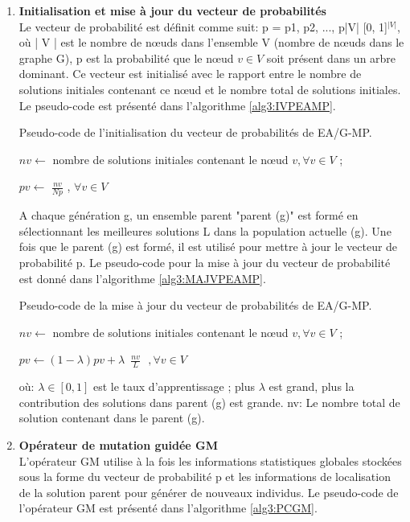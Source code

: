 \begin{enumerate}[label=\alph*)]
	\item \textbf{Initialisation et mise à jour du vecteur de probabilités}\\
	Le vecteur de probabilité est définit comme suit: p = {p1, p2, ..., p|V|} [0, 1]$^{|V|}$, où | V | est le nombre de nœuds dans l'ensemble V (nombre de nœuds dans le graphe G), p est la probabilité que le nœud $v \in V$ soit présent dans un arbre dominant. Ce vecteur est initialisé  avec le rapport entre le nombre de solutions initiales contenant ce nœud et le nombre total de solutions initiales. Le pseudo-code est présenté dans l'algorithme \ref{alg3:IVPEAMP}.\\
	
\begin{algorithm}[H]
\label{alg3:IVPEAMP}
\caption{Pseudo-code de l'initialisation du vecteur de probabilités de EA/G-MP.}
\SetAlgoLined
\DontPrintSemicolon
\large


$ nv \gets $ nombre de solutions initiales contenant le nœud $v, \forall v \in V$ ;

$ pv \gets$ \( \displaystyle \frac{nv}{Np} \) ,  $\forall v \in V $ \;


\end{algorithm}

A chaque génération g, un ensemble parent "parent (g)" est formé en sélectionnant les meilleures solutions L dans la population actuelle (g). Une fois que le parent (g) est formé, il est utilisé pour mettre à jour le vecteur de probabilité p. Le pseudo-code pour la mise à jour du vecteur de probabilité est donné dans l’algorithme \ref{alg3:MAJVPEAMP}.\\

\begin{algorithm}[H]
\label{alg3:MAJVPEAMP}
\caption{Pseudo-code de la mise à jour du vecteur de probabilités de EA/G-MP.}
\SetAlgoLined
\DontPrintSemicolon
\large


$ nv \gets $ nombre de solutions initiales contenant le nœud $v, \forall v \in V$ ;

$ pv \gets ( 1 - \lambda ) pv + \lambda \,$ \( \displaystyle \frac{nv}{L} \)  $\, \, , \forall v \in V $ \;

\end{algorithm}	
	
	
où: $\lambda \in [ 0, 1 ] $  est le taux d’apprentissage ; plus $\lambda$ est grand, plus la contribution des solutions dans parent (g) est grande.
nv: Le nombre total de solution contenant dans le parent (g).

	
	\item \textbf{Opérateur de mutation guidée GM}\\
	L'opérateur GM utilise à la fois les informations statistiques globales stockées sous la forme du vecteur de probabilité p et les informations de localisation de la solution parent pour générer de nouveaux individus. Le pseudo-code de l'opérateur GM est présenté dans l'algorithme \ref{alg3:PCGM}.
	

\end{enumerate}
